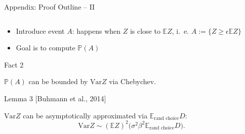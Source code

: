 \documentclass[presentation,12pt]{beamer}
\newcommand{\Expct}{\mathbb{E}}
\newcommand{\Var}{\mathrm{Var}}
\begin{document}
\begin{frame}{Appendix: Proof Outline -- II}
  \begin{columns}
  \begin{column}{0.8\textwidth}
    \begin{itemize}
      \item Introduce event $A$: happens when $Z$ is close to $\mathbb{E}Z$, i.~e.
        $A := \{ Z \ge \epsilon \mathbb{E} Z \}$
      \item Goal is to compute $\mathbb{P}(A)$
    \end{itemize}

  \begin{block}{\rule[-0.6ex]{0pt}{2.5ex}Fact 2}
    $\mathbb{P}(A)$ can be bounded by $\Var Z$ via Chebychev.
  \end{block}

  \begin{block}{\rule[-0.6ex]{0pt}{2.5ex}Lemma 3 [Buhmann et al., 2014]}
    $\Var Z$ can be asymptotically approximated via $\mathbb{E}_{\text{rand choice}} D$:
    \[
      \Var Z \sim (\Expct Z)^2 
          \bigl( \sigma^2 \beta^2 \Expct_{\text{rand choice}} D \bigr).
    \]
  \end{block}


\end{column}
\end{columns}
\end{frame}
\end{document}
